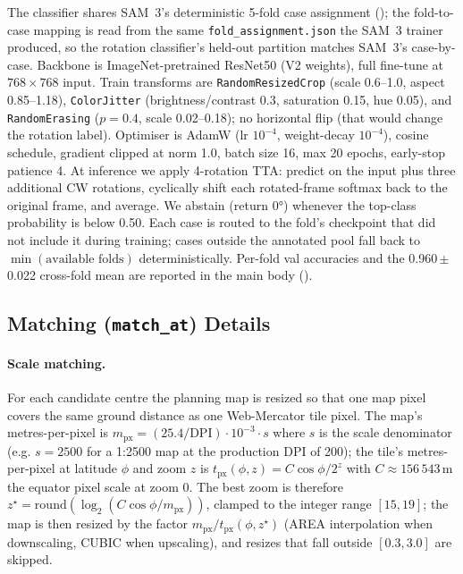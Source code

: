 \documentclass[11pt]{article}
\begin{document}
The classifier shares SAM~3's deterministic 5-fold case assignment (); the fold-to-case mapping is read from the same \texttt{fold\_assignment.json} the SAM~3 trainer produced, so the rotation classifier's held-out partition matches SAM~3's case-by-case. Backbone is ImageNet-pretrained ResNet50 (V2 weights), full fine-tune at $768\times768$ input. Train transforms are \texttt{RandomResizedCrop} (scale 0.6--1.0, aspect 0.85--1.18), \texttt{ColorJitter} (brightness/contrast 0.3, saturation 0.15, hue 0.05), and \texttt{RandomErasing} ($p=0.4$, scale 0.02--0.18); no horizontal flip (that would change the rotation label). Optimiser is AdamW (lr $10^{-4}$, weight-decay $10^{-4}$), cosine schedule, gradient clipped at norm 1.0, batch size 16, max 20 epochs, early-stop patience 4. At inference we apply 4-rotation TTA: predict on the input plus three additional CW rotations, cyclically shift each rotated-frame softmax back to the original frame, and average. We abstain (return $0°$) whenever the top-class probability is below 0.50. Each case is routed to the fold's checkpoint that did not include it during training; cases outside the annotated pool fall back to $\min(\text{available folds})$ deterministically. Per-fold val accuracies and the 0.960\,$\pm$\,0.022 cross-fold mean are reported in the main body ().

\subsection{Matching (\texttt{match\_at}) Details}
\label{subsection:matching}

\paragraph{Scale matching.}
For each candidate centre the planning map is resized so that one map pixel covers the same ground distance as one Web-Mercator tile pixel. The map's metres-per-pixel is $m_{\text{px}} = (25.4 / \text{DPI}) \cdot 10^{-3} \cdot s$ where $s$ is the scale denominator (e.g. $s=2500$ for a 1:2500 map at the production DPI of 200); the tile's metres-per-pixel at latitude $\phi$ and zoom $z$ is $t_{\text{px}}(\phi, z) = C \cos\phi / 2^z$ with $C \approx 156\,543$\,m the equator pixel scale at zoom 0. The best zoom is therefore $z^{\star} = \mathrm{round}(\log_2(C \cos\phi / m_{\text{px}}))$, clamped to the integer range $[15, 19]$; the map is then resized by the factor $m_{\text{px}} / t_{\text{px}}(\phi, z^{\star})$ (AREA interpolation when downscaling, CUBIC when upscaling), and resizes that fall outside $[0.3, 3.0]$ are skipped.
\end{document}
